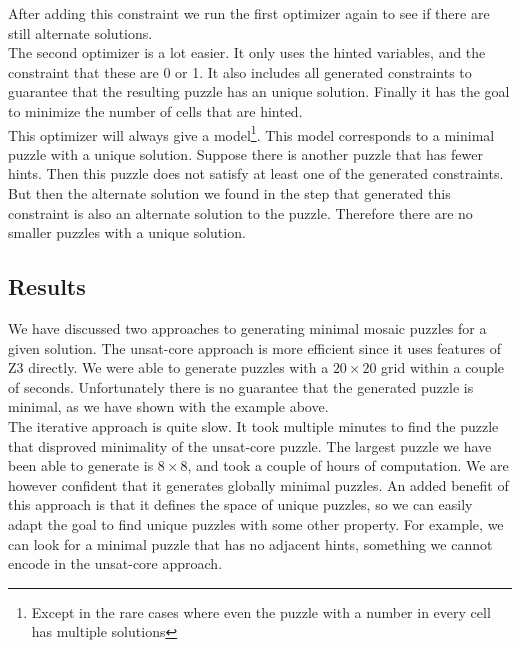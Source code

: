 \documentclass{scrartcl}
\begin{document}
	After adding this constraint we run the first optimizer again to see if there are still alternate solutions.\\

	The second optimizer is a lot easier.
	It only uses the hinted variables, and the constraint that these are 0 or 1.
	It also includes all generated constraints to guarantee that the resulting puzzle has an unique solution.
	Finally it has the goal to minimize the number of cells that are hinted.\\

	This optimizer will always give a model\footnote{Except in the rare cases where even the puzzle with a number in every cell has multiple solutions}.
	This model corresponds to a minimal puzzle with a unique solution. Suppose there is another puzzle that has fewer hints. Then this puzzle does not satisfy at least one of the generated constraints. But then the alternate solution we found in the step that generated this constraint is also an alternate solution to the puzzle. Therefore there are no smaller puzzles with a unique solution.

	\subsection{Results} %
	\label{sub:results}
	We have discussed two approaches to generating minimal mosaic puzzles for a given solution.
	The unsat-core approach is more efficient since it uses features of Z3 directly. We were able to generate puzzles with a $20\times20$ grid within a couple of seconds. Unfortunately there is no guarantee that the generated puzzle is minimal, as we have shown with the example above.\\

	The iterative approach is quite slow. It took multiple minutes to find the puzzle that disproved minimality of the unsat-core puzzle. The largest puzzle we have been able to generate is $8\times 8$, and took a couple of hours of computation. We are however confident that it generates globally minimal puzzles. An added benefit of this approach is that it defines the space of unique puzzles, so we can easily adapt the goal to find unique puzzles with some other property. For example, we can look for a minimal puzzle that has no adjacent hints, something we cannot encode in the unsat-core approach.

\end{document}
